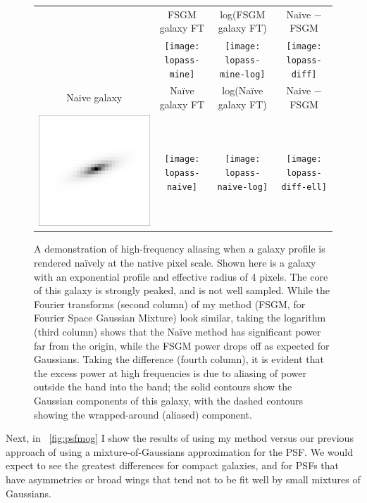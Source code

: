 \documentclass[11pt,preprint]{aastex}
\newcommand{\figref}[1]{\figurename~\ref{#1}}
\begin{document}
\begin{figure}
  \begin{center}
    \begin{tabular}{cccc}
      & FSGM galaxy FT & log(FSGM galaxy FT) & Naive $-$ FSGM \\
      &
      \texttt{[image: lopass-mine]}
      &
      \texttt{[image: lopass-mine-log]}
      &
      \texttt{[image: lopass-diff]}
      \\
      Naive galaxy & Na\"ive galaxy FT & log(Na\"ive galaxy FT) & Naive $-$ FSGM \\
      \includegraphics[height=0.24\textwidth]{lopass-naive-pix}
      &
      \texttt{[image: lopass-naive]}
      &
      \texttt{[image: lopass-naive-log]}
      &
      \texttt{[image: lopass-diff-ell]}
    \end{tabular}
    \caption{
      \label{fig:aliasing}
      A demonstration of high-frequency aliasing when a galaxy profile
      is rendered na\"ively at the native pixel scale.  Shown here is
      a galaxy with an exponential profile and effective radius of 4
      pixels.  The core of this galaxy is strongly peaked, and is not
      well sampled.  While the Fourier transforms (second column) of
      my method (FSGM, for Fourier Space Gaussian Mixture) look
      similar, taking the logarithm (third column) shows that the
      Na\"ive method has significant power far from the origin, while
      the FSGM power drops off as expected for Gaussians.  Taking the
      difference (fourth column), it is evident that the excess power
      at high frequencies is due to aliasing of power outside the band
      into the band; the solid contours show the Gaussian components
      of this galaxy, with the dashed contours showing the
      wrapped-around (aliased) component.}
  \end{center}
\end{figure}


Next, in \figref{fig:psfmog} I show the results of using my method
versus our previous approach of using a mixture-of-Gaussians
approximation for the PSF.  We would expect to see the greatest
differences for compact galaxies, and for PSFs that have asymmetries
or broad wings that tend not to be fit well by small mixtures of
Gaussians.
\end{document}
